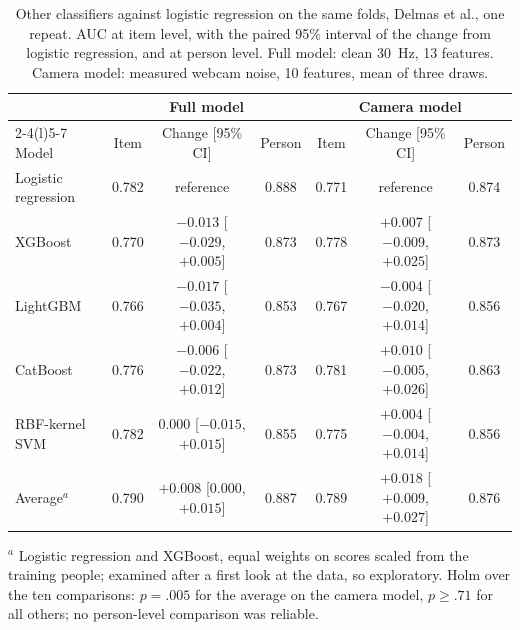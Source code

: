 \begin{table}[!htbp]
\caption{Other classifiers against logistic regression on the same folds, Delmas et al., one repeat. AUC at item level, with the paired 95\% interval of the change from logistic regression, and at person level. Full model: clean 30~Hz, 13 features. Camera model: measured webcam noise, 10 features, mean of three draws.}\label{tab:models}
\footnotesize\setlength{\tabcolsep}{2.5pt}
\begin{tabular}{@{}lcccccc@{}}
\toprule
 & \multicolumn{3}{c}{Full model} & \multicolumn{3}{c}{Camera model} \\
\cmidrule(lr){2-4}\cmidrule(l){5-7}
Model & Item & Change [95\% CI] & Person & Item & Change [95\% CI] & Person \\
\midrule
Logistic regression & 0.782 & reference & 0.888 & 0.771 & reference & 0.874 \\
XGBoost & 0.770 & $-0.013$ [$-0.029$, $+0.005$] & 0.873 & 0.778 & $+0.007$ [$-0.009$, $+0.025$] & 0.873 \\
LightGBM & 0.766 & $-0.017$ [$-0.035$, $+0.004$] & 0.853 & 0.767 & $-0.004$ [$-0.020$, $+0.014$] & 0.856 \\
CatBoost & 0.776 & $-0.006$ [$-0.022$, $+0.012$] & 0.873 & 0.781 & $+0.010$ [$-0.005$, $+0.026$] & 0.863 \\
RBF-kernel SVM & 0.782 & $0.000$ [$-0.015$, $+0.015$] & 0.855 & 0.775 & $+0.004$ [$-0.004$, $+0.014$] & 0.856 \\
Average$^{a}$ & 0.790 & $+0.008$ [$0.000$, $+0.015$] & 0.887 & 0.789 & $+0.018$ [$+0.009$, $+0.027$] & 0.876 \\
\bottomrule
\end{tabular}
\begin{flushleft}\scriptsize
$^{a}$ Logistic regression and XGBoost, equal weights on scores scaled from the training people; examined after a first look at the data, so exploratory. Holm over the ten comparisons: $p=.005$ for the average on the camera model, $p\geq.71$ for all others; no person-level comparison was reliable.
\end{flushleft}
\end{table}

